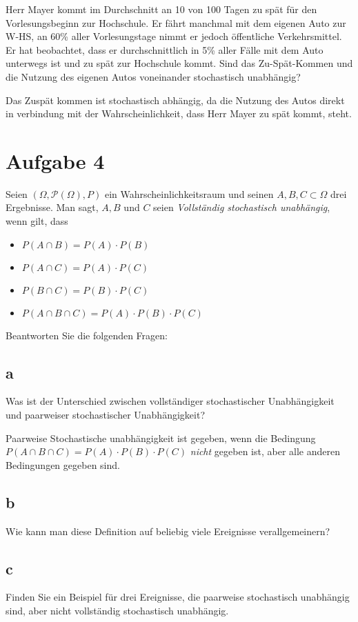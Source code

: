 Herr Mayer kommt im Durchschnitt an 10 von 100 Tagen zu spät für den
Vorlesungsbeginn zur Hochschule. Er fährt manchmal mit dem eigenen Auto zur
W-HS, an 60\% aller Vorlesungstage nimmt er jedoch öffentliche Verkehrsmittel.
Er hat beobachtet, dass er durchschnittlich in 5\% aller Fälle mit dem Auto
unterwegs ist und zu spät zur Hochschule kommt. Sind das Zu-Spät-Kommen und die
Nutzung des eigenen Autos voneinander stochastisch unabhängig?

Das Zuspät kommen ist stochastisch abhängig, da die Nutzung des Autos direkt in
verbindung mit der Wahrscheinlichkeit, dass Herr Mayer zu spät kommt, steht.

\section{Aufgabe 4}

Seien $(\Omega, \mathcal{P}(\Omega), P)$ ein Wahrscheinlichkeitsraum und seinen
$A, B, C \subset \Omega$ drei Ergebnisse. Man sagt, $A, B$ und $C$ seien
\textit{Vollständig stochastisch unabhängig}, wenn gilt, dass

\begin{itemize}
    \item $P(A \cap B) = P(A) \cdot P(B)$
    \item $P(A \cap C) = P(A) \cdot P(C)$
    \item $P(B \cap C) = P(B) \cdot P(C)$
    \item $P(A \cap B \cap C) = P(A) \cdot P(B) \cdot P(C)$
\end{itemize}

Beantworten Sie die folgenden Fragen:

\subsection{a}

Was ist der Unterschied zwischen vollständiger stochastischer Unabhängigkeit
und paarweiser stochastischer Unabhängigkeit?

Paarweise Stochastische unabhängigkeit ist gegeben, wenn die Bedingung $P(A
    \cap B \cap C) = P(A) \cdot P(B) \cdot P(C)$ \textit{nicht} gegeben ist, aber
alle anderen Bedingungen gegeben sind.

\subsection{b}

Wie kann man diese Definition auf beliebig viele Ereignisse verallgemeinern?

\subsection{c}

Finden Sie ein Beispiel für drei Ereignisse, die paarweise stochastisch
unabhängig sind, aber nicht vollständig stochastisch unabhängig.